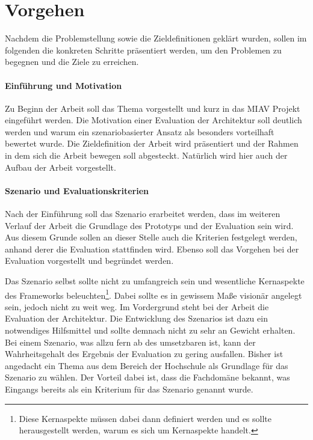 \documentclass[11pt,headsepline,a4paper,bibtotoc,liststotoc,DIV12,BCOR12mm]{scrartcl}
\begin{document}

\section{Vorgehen} %
\label{sec:vorgehen}

  Nachdem die Problemstellung sowie die Zieldefinitionen geklärt wurden, sollen im folgenden die konkreten Schritte präsentiert werden, um den Problemen zu begegnen und die Ziele zu erreichen.

\paragraph{Einführung und Motivation} %
\label{par:einfuehrung}
  
  Zu Beginn der Arbeit soll das Thema vorgestellt und kurz in das MIAV Projekt eingeführt werden. Die Motivation einer Evaluation der Architektur soll deutlich werden und warum ein szenariobasierter Ansatz als besonders vorteilhaft bewertet wurde. Die Zieldefinition der Arbeit wird präsentiert und der Rahmen in dem sich die Arbeit bewegen soll abgesteckt. Natürlich wird hier auch der Aufbau der Arbeit vorgestellt.
  

\paragraph{Szenario und Evaluationskriterien} %
\label{par:szenario_und_evaluationskriterien}

  Nach der Einführung soll das Szenario erarbeitet werden, dass im weiteren Verlauf der Arbeit die Grundlage des Prototyps und der Evaluation sein wird. Aus diesem Grunde sollen an dieser Stelle auch die Kriterien festgelegt werden, anhand derer die Evaluation stattfinden wird. Ebenso soll das Vorgehen bei der Evaluation vorgestellt und begründet werden.
  
  Das Szenario selbst sollte nicht zu umfangreich sein und wesentliche Kernaspekte des Frameworks beleuchten\footnote{Diese Kernaspekte müssen dabei dann definiert werden und es sollte herausgestellt werden, warum es sich um Kernaspekte handelt.}. Dabei sollte es in gewissem Maße visionär angelegt sein, jedoch nicht zu weit weg. Im Vordergrund steht bei der Arbeit die Evaluation der Architektur. Die Entwicklung des Szenarios ist dazu ein notwendiges Hilfsmittel und sollte demnach nicht zu sehr an Gewicht erhalten. Bei einem Szenario, was allzu fern ab des umsetzbaren ist, kann der Wahrheitsgehalt des Ergebnis der Evaluation zu gering ausfallen. Bisher ist angedacht ein Thema aus dem Bereich der Hochschule als Grundlage für das Szenario zu wählen. Der Vorteil dabei ist, dass die Fachdomäne bekannt, was Eingangs bereits als ein Kriterium für das Szenario genannt wurde.
  
\end{document}
